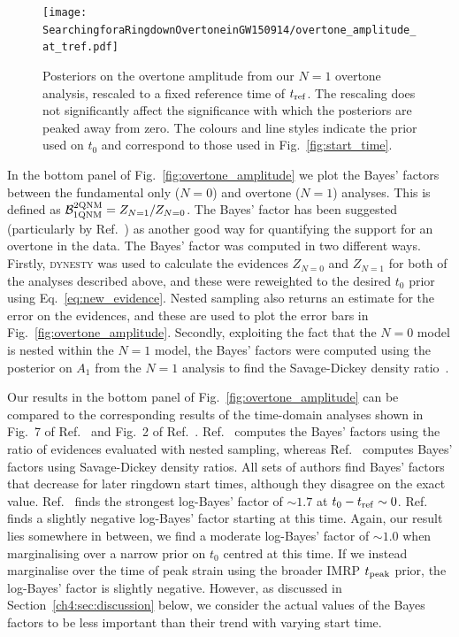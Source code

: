 \begin{figure}[t]
    \centering
    \texttt{[image: SearchingforaRingdownOvertoneinGW150914/overtone\_amplitude\_at\_tref.pdf]}
    \caption[Posteriors on the GW150914 overtone amplitude, as in Fig.~\ref{fig:overtone_amplitude}, rescaled to a fixed reference time]{ 
    Posteriors on the overtone amplitude from our $N=1$ overtone analysis, rescaled to a fixed reference time of $t_{\rm ref}$.
    The rescaling does not significantly affect the significance with which the posteriors are peaked away from zero.
    The colours and line styles indicate the prior used on $t_0$ and correspond to those used in Fig.~\ref{fig:start_time}.
    }
    \label{fig:amp_at_tref}
\end{figure}

In the bottom panel of Fig.~\ref{fig:overtone_amplitude} we plot the Bayes' factors between the fundamental only ($N=0$) and overtone ($N=1$) analyses.
This is defined as $\mathcal{B}_{\rm 1QNM}^{\rm 2QNM}=Z_{N=1}/Z_{N=0}$.
The Bayes' factor has been suggested (particularly by Ref.~\cite{Cotesta:2022pci}) as another good way for quantifying the support for an overtone in the data.
The Bayes' factor was computed in two different ways.
Firstly, \textsc{dynesty} was used to calculate the evidences $Z_{N=0}$ and $Z_{N=1}$ for both of the analyses described above, and these were reweighted to the desired $t_0$ prior using Eq.~\ref{eq:new_evidence}. 
Nested sampling also returns an estimate for the error on the evidences, and these are used to plot the error bars in Fig.~\ref{fig:overtone_amplitude}.
Secondly, exploiting the fact that the $N=0$ model is nested within the $N=1$ model, the Bayes' factors were computed using the posterior on $A_1$ from the $N=1$ analysis to find the Savage-Dickey density ratio~\cite{10.2307/2958475}. 

Our results in the bottom panel of Fig.~\ref{fig:overtone_amplitude} can be compared to the corresponding results of the time-domain analyses shown in Fig.~7 of Ref.~\cite{Isi:2022mhy} and Fig.~2 of Ref.~\cite{Cotesta:2022pci}.
Ref.~\cite{Cotesta:2022pci} computes the Bayes' factors using the ratio of evidences evaluated with nested sampling, whereas Ref.~\cite{Isi:2022mhy} computes Bayes' factors using Savage-Dickey density ratios.
All sets of authors find Bayes' factors that decrease for later ringdown start times, although they disagree on the exact value.
Ref.~\cite{Isi:2022mhy} finds the strongest log-Bayes' factor of $\sim 1.7$ at $t_0-t_{\rm ref} \sim 0$.
Ref.~\cite{Cotesta:2022pci} finds a slightly negative log-Bayes' factor starting at this time.
Again, our result lies somewhere in between, we find a moderate log-Bayes' factor of $\sim 1.0$ when marginalising over a narrow prior on $t_0$ centred at this time.
If we instead marginalise over the time of peak strain using the broader IMRP $t_{\rm peak}$ prior, the log-Bayes' factor is slightly negative.
However, as discussed in Section~\ref{ch4:sec:discussion} below, we consider the actual values of the Bayes factors to be less important than their trend with varying start time.


